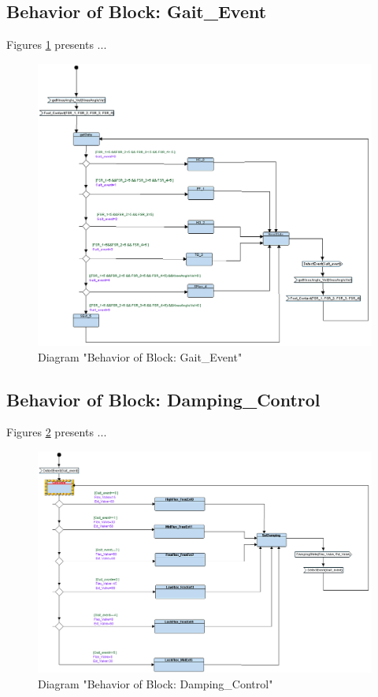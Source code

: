 \subsection{Behavior of Block: Gait\_Event}
Figures \ref{fig:GaitEventGaitEvent25} presents ...
\begin{figure}[htb]
\centering
\includegraphics[width=\textwidth]{img_2_5.png}
\caption{Diagram "Behavior of Block: Gait\_Event"}
\label{fig:GaitEventGaitEvent25}
\end{figure}

\subsection{Behavior of Block: Damping\_Control}
Figures \ref{fig:DampingControlDampingControl26} presents ...
\begin{figure}[htb]
\centering
\includegraphics[width=\textwidth]{img_2_6.png}
\caption{Diagram "Behavior of Block: Damping\_Control"}
\label{fig:DampingControlDampingControl26}
\end{figure}


